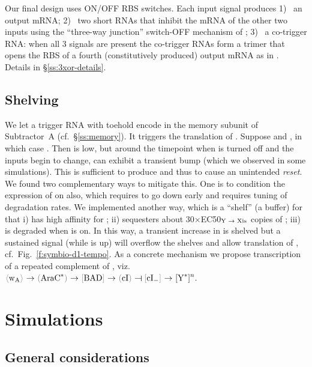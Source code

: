 \documentclass[12pt,notitlepage]{article}
\let\cite\citep
\newcommand{\cbra}[1]{{\ensuremath{\color{gray}{#1}}}}
\newcommand{\signal}[1]{{{\cbra{\langle}\ce{#1}\cbra{\rangle}}}}
\newcommand{\protein}[1]{{{\cbra{(}\ce{#1}\cbra{)}}}}
\newcommand{\promoter}[1]{{{\cbra{[}\ce{#1}\cbra{]}}}}
\newcommand{\act}{\ {\ensuremath{\mathbin{\to}}}\ }
\newcommand{\rep}{\ {\ensuremath{\mathrel{\raisebox{-.3ex}{\rotatebox{90}{\scalebox{1}[1.2]{$\bot$}}}}}}\ }
\newcommand{\ra}[1]{{\color{Blue}#1}}
\begin{document}
\ra{
Our final design 
uses ON/OFF RBS switches. 
%
Each input signal produces 
1)~%
an output mRNA;
2)~%
two short RNAs
that inhibit the mRNA
of the other two inputs
using 
the ``three-way junction'' switch-OFF mechanism
of \citet{Kim2019};
3)~%
a co-trigger RNA:
when all 3 signals are present
the co-trigger RNAs form a trimer 
that opens the RBS of a fourth 
(constitutively produced) 
output mRNA
as in 
\cite[\href{https://www.nature.com/articles/nature23271/figures/2}{Fig.~2e}]{GreenETAL2017}.
}
%
%
Details in \S\ref{ss:3xor-details}.


\subsection{Shelving}

We let 
\ra{a trigger RNA  with toehold}
encode 
in the memory subunit
of Subtractor~A (cf.~\S\ref{ss:memory}).
%
It triggers the translation of .
%
%
Suppose
 and ,
in which case .
%
%
Then  is low,
but
around the timepoint when 
 is turned off
and the inputs begin to change,
 can exhibit a transient bump
(which we observed in some simulations).
%
This is sufficient to produce 
and thus to cause an unintended \emph{reset}.
%
We found two complementary ways to mitigate this.
%
One is to condition 
the expression of 
on  also,
which requires  to go down early
and requires tuning of degradation rates.
%
We implemented another way,
which
is a ``shelf'' (a buffer) for 
that 
%
i)
has high affinity for ;
%
ii)
sequesters 
about 
30$\times$EC50${}_\text{\ce{Y}\act\ce{Xis}}$
copies of ;
%
iii)
is degraded when  is on.
%
In this way, 
a transient increase in  is shelved
but a sustained signal 
(while  is up)
will overflow the shelves and 
allow
translation of ,
cf.~Fig.~\ref{f:symbio-d1-tempo}.
%
%
%
%
As a concrete mechanism
we propose
transcription of 
a repeated complement of ,
viz.~%
$
	\signal{\ce{w_A}} \act \protein{AraC^*} \act \promoter{BAD} 
	\act 
	\protein{cI} \rep \promoter{cI_-} \act
	\ce{[Y^*]^n}
	.
$
%



\section{Simulations}

\subsection{General considerations}
\end{document}
